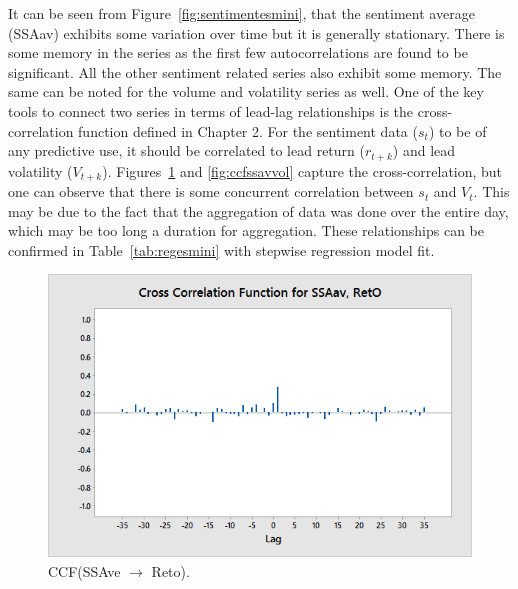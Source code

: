 It can be seen from Figure~\ref{fig:sentimentesmini}, that the sentiment average (SSAav) exhibits some variation over time but it is generally stationary. There is some memory in the series as the first few autocorrelations are found to be significant. All the other sentiment related series also exhibit some memory. The same can be noted for the volume and volatility series as well. One of the key tools to connect two series in terms of lead-lag relationships is the cross-correlation function defined in Chapter 2. For the sentiment data ($s_t$) to be of any predictive use, it should be correlated to lead return ($r_{t+k}$) and lead volatility ($V_{t+k}$). Figures~\ref{fig:ccfssavreto} and \ref{fig:ccfssavvol} capture the cross-correlation, but one can observe that there is some concurrent correlation between $s_t$ and $V_t$. This may be due to the fact that the aggregation of data was done over the entire day, which may be too long a duration for aggregation. These relationships can be confirmed in Table~\ref{tab:regesmini} with stepwise regression model fit. 


	\begin{figure}[!ht]
	\centering
	\includegraphics[width=\textwidth]{chapters/chapter_news_an/figures/ch4sec4crossfssaavreto} 
	\caption{CCF(SSAve $\rightarrow$ Reto). \label{fig:ccfssavreto}}
	\end{figure}

